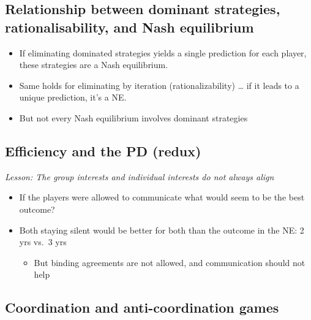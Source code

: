 \documentclass[]{article}
\providecommand{\tightlist}{%
  \setlength{\itemsep}{0pt}\setlength{\parskip}{0pt}}
\begin{document}
\hypertarget{relationship-between-dominant-strategies-rationalisability-and-nash-equilibrium}{%
\subsection{Relationship between dominant strategies, rationalisability,
and Nash
equilibrium}\label{relationship-between-dominant-strategies-rationalisability-and-nash-equilibrium}}

\begin{itemize}
\item
  If eliminating dominated strategies yields a single prediction for
  each player, these strategies are a Nash equilibrium.
\item
  Same holds for eliminating by iteration (rationalizability) \ldots{}
  if it leads to a unique prediction, it's a NE.
\item
  But not every Nash equilibrium involves dominant strategies
\end{itemize}

\hypertarget{efficiency-and-the-pd-redux}{%
\subsection{Efficiency and the PD
(redux)}\label{efficiency-and-the-pd-redux}}

\emph{Lesson: The group interests and individual interests do not always
align}

\begin{itemize}
\item
  If the players were allowed to communicate what would seem to be the
  best outcome?
\item
  Both staying silent would be better for both than the outcome in the
  NE: 2 yrs vs.~3 yrs

  \begin{itemize}
  \tightlist
  \item
    But binding agreements are not allowed, and communication should not
    help
  \end{itemize}
\end{itemize}

\hypertarget{coordination-and-anti-coordination-games}{%
\subsection{Coordination and anti-coordination
games}\label{coordination-and-anti-coordination-games}}
\end{document}
